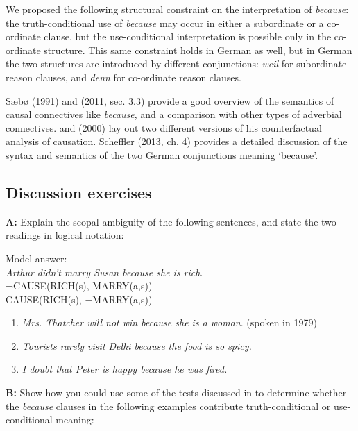 We proposed the following structural constraint on the interpretation of \textit{because}: the truth-conditional use of \textit{because} may occur in either a subordinate or a co-ordinate clause, but the use-conditional interpretation is possible only in the co-ordinate structure. This same constraint holds in German as well, but in German the two structures are introduced by different conjunctions: \textit{weil} for subordinate reason clauses, and \textit{denn} for co-ordinate reason clauses.



\furtherreading



Sæbø (1991) and (2011, sec. 3.3) provide a good overview of the semantics of causal connectives like \textit{because}, and a comparison with other types of adverbial connectives. \citet{Lewis1973b} and (2000) lay out two different versions of his counterfactual analysis of causation. Scheffler (2013, ch. 4) provides a detailed discussion of the syntax and semantics of the two German conjunctions meaning ‘because’.


\subsection*{Discussion exercises}

\textbf{A:} Explain the scopal ambiguity of the following sentences, and state the two readings in logical notation:

\ea
\textsf{Model answer:}\\
\textsf{\textit{Arthur didn’t marry Susan because she is rich}}\textsf{.}\\
\ea ¬CAUSE(RICH(s), MARRY(a,s))\\
\ex CAUSE(RICH(s), ¬MARRY(a,s))\\
\z \z

\begin{enumerate}
\item 
\textit{Mrs. Thatcher will not win because she is a woman}. (spoken in 1979)
\item \itshape
Tourists rarely visit Delhi because the food is so spicy.
\item 
\textit{I doubt that Peter is happy because he was fired.}
\end{enumerate}

\textbf{B:} Show how you could use some of the tests discussed in  to determine whether the \textit{because} clauses in the following examples contribute truth-conditional or use-conditional meaning:

